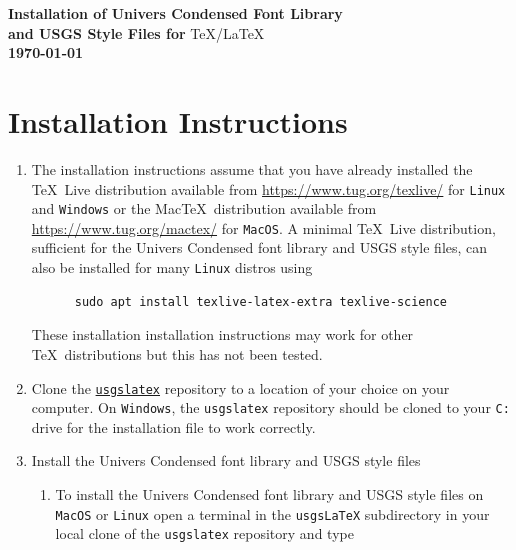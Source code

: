 \documentclass[11pt]{article}
\begin{document}
\renewcommand\sfdefault{fun}


\begin{centering}
\noindent \textsf{\bfseries \Large Installation of Univers Condensed Font Library \\ and USGS Style Files for} \TeX/\LaTeX \\
\normalsize  \textsf{\bfseries \today \\}
\end{centering}

\addvspace{\baselineskip}

\section*{\textsf{Installation Instructions}}

\begin{enumerate}

	\item The installation instructions assume that you have already installed the \TeX~Live distribution available from \url{https://www.tug.org/texlive/} for \texttt{Linux} and \texttt{Windows} or the Mac\TeX~distribution available from \url{https://www.tug.org/mactex/} for \texttt{MacOS}. A minimal \TeX~Live distribution, sufficient for the Univers Condensed font library and USGS style files, can also be installed for many \texttt{Linux} distros using
	
	\begin{verbatim}
	  sudo apt install texlive-latex-extra texlive-science
	\end{verbatim}
	 
	These installation installation instructions may work for other \TeX~distributions but this has not been tested.
	
	\item Clone the \href{https://github.com/MODFLOW-USGS/usgslatex}{\texttt{usgslatex}} repository to a location of your choice on your computer. On \texttt{Windows}, the \texttt{usgslatex} repository should be cloned to your \texttt{C:} drive for the installation file to work correctly.
	
	\item Install the Univers Condensed font library and USGS style files
	
	\begin{enumerate}
	
		\item To install the Univers Condensed font library and USGS style files on \texttt{MacOS} or \texttt{Linux} open a terminal in the \texttt{usgsLaTeX} subdirectory in your local clone of the \texttt{usgslatex} repository and type
		

\end{enumerate}
\end{enumerate}
\end{document}
